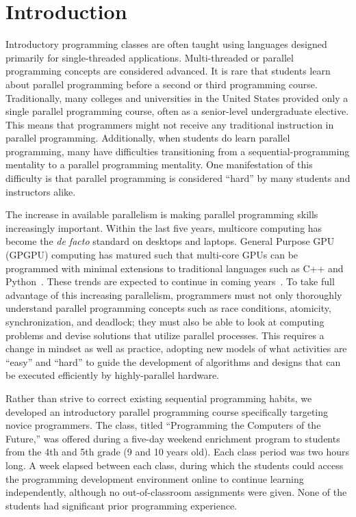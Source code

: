 \documentclass{sig-alternate}
\begin{document}
\section{Introduction}
Introductory programming classes are often taught 
using languages designed primarily for single-threaded applications.  Multi-threaded or
parallel programming concepts are considered advanced. It is rare that students learn about
parallel programming before a second or third programming course.  
Traditionally, many colleges and universities in the United States provided only a single parallel programming course, often as a senior-level undergraduate elective. 
This means that programmers might not receive any traditional instruction in parallel programming.
Additionally, when students do learn parallel programming, many have difficulties transitioning
from a sequential-programming mentality to a parallel programming mentality.
One manifestation of this difficulty is that parallel programming is considered ``hard'' 
by many students and instructors alike.~\cite{parallelExpectations}

The increase in available parallelism is making parallel programming skills increasingly important.  
Within the last five years, multicore computing has become the \emph{de facto} standard on
desktops and laptops.
General Purpose GPU (GPGPU) computing has matured such that multi-core 
GPUs can be programmed with minimal extensions to traditional languages such as C++ and 
Python~\cite{gpgpuLanguages}.  
These trends are expected to continue in coming years~\cite{multicoreTrends}.
To take full advantage of this increasing parallelism,
programmers must not only thoroughly understand parallel programming concepts 
such as race conditions, atomicity, synchronization, and deadlock;
they must also be able to look at computing problems and devise solutions that utilize parallel processes.
This requires a change in mindset as well as practice,
adopting new models of what activities are ``easy'' and ``hard''
to guide the development of algorithms and designs that can be executed efficiently by highly-parallel hardware.

Rather than strive to correct existing sequential programming habits,
we developed an introductory parallel programming course specifically targeting novice programmers.
The class, titled ``Programming the Computers of the Future,'' was offered during a five-day weekend enrichment program to students from the 4th and 5th grade (9 and 10 years old).
Each class period was two hours long.
A week elapsed between each class, during which the students
could access the programming development environment online to continue learning independently,
although no out-of-classroom assignments were given.
None of the students had significant prior programming experience.
\end{document}
